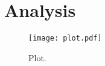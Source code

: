 \section{Analysis}
\label{sec:Analysis}

\begin{figure}
  \centering
  \texttt{[image: plot.pdf]}
  \caption{Plot.}
  \label{fig:plot}
\end{figure}

